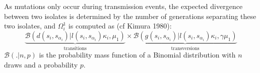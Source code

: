 \documentclass[10pt]{article}
\begin{document}
As mutations only occur during transmission events, the expected divergence between two isolates is determined by the number of generations separating these two isolates, and $\Omega_i^1$ is computed as (cf Kimura 1980): 
\begin{equation}
\underbrace{\mathcal{B}\left(d(s_i,s_{\alpha_i}) | l(s_i,s_{\alpha_i}) \kappa_i, \mu_1 \right)}_{\mbox{transitions}}
\times 
\underbrace{\mathcal{B}\left(g(s_i,s_{\alpha_i}) | l(s_i,s_{\alpha_i}) \kappa_i, \gamma \mu_1 \right)}_{\mbox{transversions}}
\end{equation}
% 
$\mathcal{B}(. | n, p)$ is the probability mass function of a Binomial distribution with $n$ draws and a probability $p$.
~\\

% 
~\\
\end{document}
